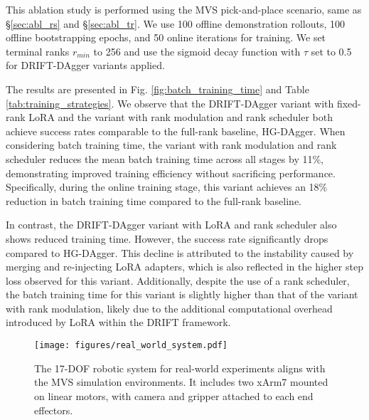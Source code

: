 This ablation study is performed using the MVS pick-and-place scenario, same as \S\ref{sec:abl_rs} and \S\ref{sec:abl_tr}. We use 100 offline demonstration rollouts, 100 offline bootstrapping epochs, and 50 online iterations for training. We set terminal ranks $r_{min}$ to 256 and use the sigmoid decay function with $\tau$ set to 0.5 for DRIFT-DAgger variants applied.

The results are presented in Fig. \ref{fig:batch_training_time} and Table \ref{tab:training_strategies}. We observe that the DRIFT-DAgger variant with fixed-rank LoRA and the variant with rank modulation and rank scheduler both achieve success rates comparable to the full-rank baseline, HG-DAgger. When considering batch training time, the variant with rank modulation and rank scheduler reduces the mean batch training time across all stages by 11\%, demonstrating improved training efficiency without sacrificing performance. Specifically, during the online training stage, this variant achieves an 18\% reduction in batch training time compared to the full-rank baseline. 

In contrast, the DRIFT-DAgger variant with LoRA and rank scheduler also shows reduced training time. However, the success rate significantly drops compared to HG-DAgger. This decline is attributed to the instability caused by merging and re-injecting LoRA adapters, which is also reflected in the higher step loss observed for this variant. Additionally, despite the use of a rank scheduler, the batch training time for this variant is slightly higher than that of the variant with rank modulation, likely due to the additional computational overhead introduced by LoRA within the DRIFT framework.

\begin{figure}
\centering
\texttt{[image: figures/real\_world\_system.pdf]}
\caption{The 17-DOF robotic system for real-world experiments aligns with the MVS simulation environments. It includes two xArm7 mounted on linear motors, with camera and gripper attached to each end effectors.}
\label{fig:real_world_system}
\end{figure}


